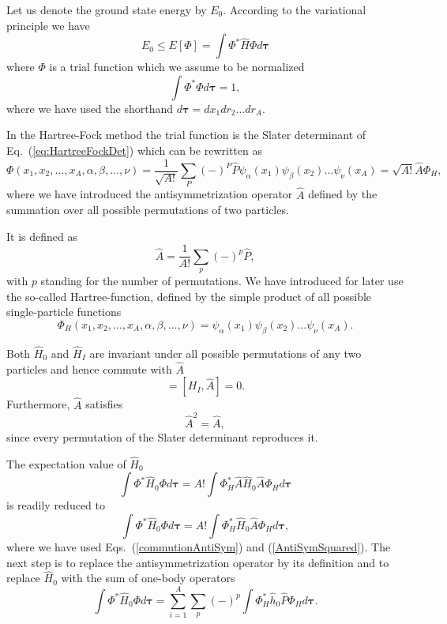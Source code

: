 \documentclass[%
twoside,                 %
final,                   %
10pt]{article}
\begin{document}
Let us denote the ground state energy by $E_0$. According to the
variational principle we have
\[
  E_0 \le E[\Phi] = \int \Phi^*\hat{H}\Phi d\mathbf{\tau}
\]
where $\Phi$ is a trial function which we assume to be normalized
\[
  \int \Phi^*\Phi d\mathbf{\tau} = 1,
\]
where we have used the shorthand $d\mathbf{\tau}=dx_1dr_2\dots dr_A$.




In the Hartree-Fock method the trial function is the Slater
determinant of Eq.~(\ref{eq:HartreeFockDet}) which can be rewritten as 
\[
  \Phi(x_1,x_2,\dots,x_A,\alpha,\beta,\dots,\nu) = \frac{1}{\sqrt{A!}}\sum_{P} (-)^P\hat{P}\psi_{\alpha}(x_1)
    \psi_{\beta}(x_2)\dots\psi_{\nu}(x_A)=\sqrt{A!}\hat{A}\Phi_H,
\]
where we have introduced the antisymmetrization operator $\hat{A}$ defined by the 
summation over all possible permutations of two particles.



It is defined as
\begin{equation}
  \hat{A} = \frac{1}{A!}\sum_{p} (-)^p\hat{P},
\label{antiSymmetryOperator}
\end{equation}
with $p$ standing for the number of permutations. We have introduced for later use the so-called
Hartree-function, defined by the simple product of all possible single-particle functions
\[
  \Phi_H(x_1,x_2,\dots,x_A,\alpha,\beta,\dots,\nu) =
  \psi_{\alpha}(x_1)
    \psi_{\beta}(x_2)\dots\psi_{\nu}(x_A).
\]


Both $\hat{H}_0$ and $\hat{H}_I$ are invariant under all possible permutations of any two particles
and hence commute with $\hat{A}$
\begin{equation}
  [H_0,\hat{A}] = [H_I,\hat{A}] = 0. \label{commutionAntiSym}
\end{equation}
Furthermore, $\hat{A}$ satisfies
\begin{equation}
  \hat{A}^2 = \hat{A},  \label{AntiSymSquared}
\end{equation}
since every permutation of the Slater
determinant reproduces it. 



The expectation value of $\hat{H}_0$ 
\[
  \int \Phi^*\hat{H}_0\Phi d\mathbf{\tau} 
  = A! \int \Phi_H^*\hat{A}\hat{H}_0\hat{A}\Phi_H d\mathbf{\tau}
\]
is readily reduced to
\[
  \int \Phi^*\hat{H}_0\Phi d\mathbf{\tau} 
  = A! \int \Phi_H^*\hat{H}_0\hat{A}\Phi_H d\mathbf{\tau},
\]
where we have used Eqs.~(\ref{commutionAntiSym}) and
(\ref{AntiSymSquared}). The next step is to replace the antisymmetrization
operator by its definition and to
replace $\hat{H}_0$ with the sum of one-body operators
\[
  \int \Phi^*\hat{H}_0\Phi  d\mathbf{\tau}
  = \sum_{i=1}^A \sum_{p} (-)^p\int 
  \Phi_H^*\hat{h}_0\hat{P}\Phi_H d\mathbf{\tau}.
\]
\end{document}
